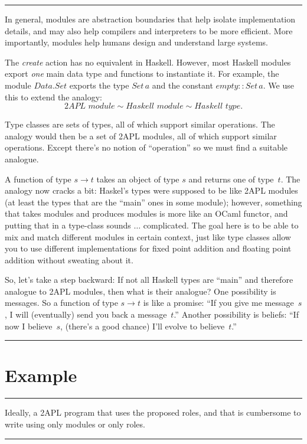 \documentclass[conference,compsoc]{IEEEtran}
\newenvironment{notes}{\medskip\hrule\nobreak\smallskip\narrower}{\smallskip\hrule\medskip}
\begin{document}
\begin{notes}
In general, modules are abstraction boundaries that help isolate
implementation details, and may also help compilers and interpreters to be
more efficient.  More importantly, modules help humans design and
understand large systems.

The \textit{create} action has no equivalent in Haskell. However, most
Haskell modules export \emph{one} main data type and functions to
instantiate it.  For example, the module $\mathit{Data}.\mathit{Set}$
exports the type $\mathit{Set}\,a$ and the constant
$\mathit{empty}::\mathit{Set}\,a$. We use this to extend the analogy: \[
\textit{2APL module} \sim \textit{Haskell module} \sim \textit{Haskell
type}. \]

Type classes are sets of types, all of which support similar operations.
The analogy would then be a set of 2APL modules, all of which support
similar operations. Except there's no notion of ``operation'' so we must
find a suitable analogue.

A function of type $s\to t$ takes an object of type $s$ and returns one
of type~$t$. The analogy now cracks a bit: Haskel's types were supposed
to be like 2APL modules (at least the types that are the ``main'' ones
in some module); however, something that takes modules and produces modules
is more like an OCaml functor, and putting that in a type-class sounds
$\ldots$ complicated. The goal here is to be able to mix and match different
modules in certain context, just like type classes allow you to use different
implementations for fixed point addition and floating point addition without
sweating about it.

So, let's take a step backward: If not all Haskell types are ``main'' and
therefore analogue to 2APL modules, then what is their analogue? One
possibility is messages. So a function of type $s\to t$ is like a promise:
``If you give me message~$s$, I will (eventually) send you back a
message~$t$.'' Another possibility is beliefs: ``If now I believe~$s$,
(there's a good chance) I'll evolve to believe~$t$.''

\end{notes}

\section{Example}

\begin{notes}
Ideally, a 2APL program that uses the proposed roles, and that is 
cumbersome to write using only modules or only roles.
\end{notes}
\end{document}
